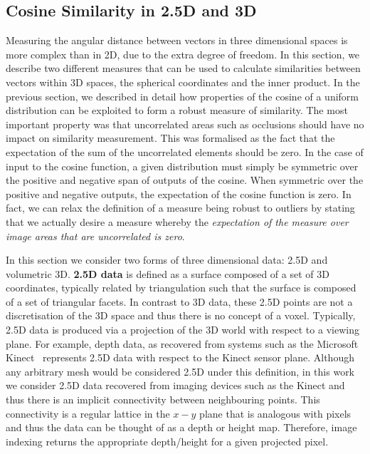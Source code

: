 \subsection{Cosine Similarity in 2.5D and 3D}\label{subsec:singl_img_cosine_3d}
Measuring the angular distance between vectors in three dimensional spaces
is more complex than in 2D, due to the extra degree of freedom. In this
section, we describe two different measures that can be used to calculate
similarities between vectors within 3D spaces, the spherical coordinates and the
inner product. In the previous section, we described in detail how properties of
the cosine of a uniform distribution can be exploited to form a robust measure
of similarity. The most important property was that uncorrelated areas such as
occlusions should have no impact on similarity measurement. This was formalised
as the fact that the expectation of the sum of the uncorrelated elements should
be zero. In the case of input to the cosine function, a given distribution must
simply be symmetric over the positive and negative span of outputs of the
cosine. When symmetric over the positive and negative outputs, the expectation
of the cosine function is zero. In fact, we can relax the definition of a
measure being robust to outliers by stating that we actually desire a measure
whereby the \textit{expectation of the measure over image areas that are
uncorrelated is zero}.

In this section we consider two forms of three dimensional
data: 2.5D and volumetric 3D. \textbf{2.5D data} is defined as a surface composed
of a set of 3D coordinates, typically related by triangulation such that
the surface is composed of a set of triangular facets. In contrast to 3D data,
these 2.5D points are not a discretisation of the 3D space and thus there
is no concept of a voxel. Typically, 2.5D data is produced via a projection
of the 3D world with respect to a viewing plane. For example, depth data, as
recovered from systems such as the Microsoft Kinect~\cite{zhang2012microsoft}
represents 2.5D data with respect to the Kinect sensor plane. Although any
arbitrary mesh would be considered 2.5D under this definition, in this work
we consider 2.5D data recovered from imaging devices such as the Kinect and thus
there is an implicit connectivity between neighbouring points. This connectivity
is a regular lattice in the $x-y$ plane that is analogous with pixels and thus
the data can be thought of as a depth or height map. Therefore, image indexing
returns the appropriate depth/height for a given projected pixel.


